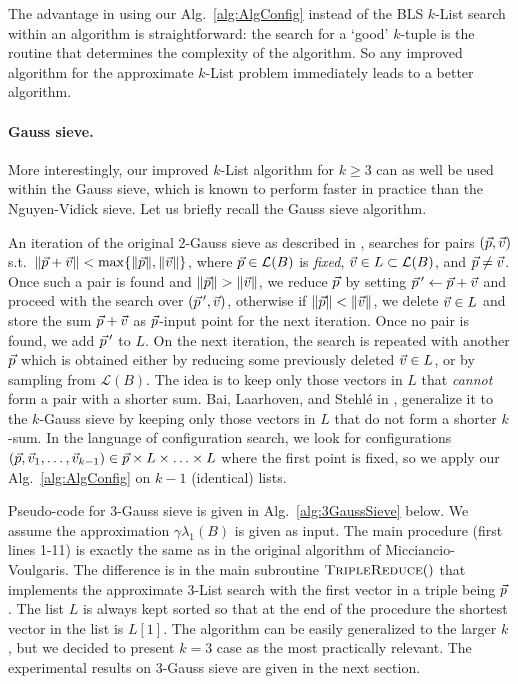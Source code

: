 The advantage in using our Alg.~\ref{alg:AlgConfig} instead of the BLS $k$-List search within an \appSVP algorithm is straightforward: the search for a `good' $k$-tuple is the routine that determines the complexity of the algorithm. So any improved algorithm for the approximate $k$-List problem immediately leads to a better \appSVP algorithm. 

\paragraph{Gauss sieve.} More interestingly, our improved $k$-List algorithm for $k \geq 3$ can as well be used within the Gauss sieve, which is known to perform faster in practice than the Nguyen-Vidick sieve. Let us briefly recall the Gauss sieve algorithm.

An iteration of the original 2-Gauss sieve as described in \cite{STOC:MicVou10}, searches for pairs $(\pvec, \vvec)$ s.t.\ $\| \pvec + \vvec \| < \max \{\| \pvec \|, \| \vvec \| \}$, where $\pvec \in \mathcal{L}(B)$ is \emph{fixed}, $\vvec \in L \subset \mathcal{L}(B)$, and $\pvec \neq \vvec$. Once such a pair is found and $\| \pvec \| > \| \vvec \|$, we reduce $\pvec$ by setting $\pvec'  \leftarrow \pvec + \vvec$ and proceed with the search over $(\pvec', \vvec)$, otherwise if $\| \pvec \| < \| \vvec \|$, we delete $\vvec \in L$ and store the sum $ \pvec + \vvec$ as $\pvec$-input point for the next iteration. Once no pair is found, we add $\pvec'$ to $L$. On the next iteration, the search is repeated with another $\pvec$ which is obtained either by reducing some previously deleted $\vvec \in L$, or by sampling from $\mathcal{L}(B)$. The idea is to keep only those vectors in $L$ that \emph{cannot} form a pair with a shorter sum. Bai, Laarhoven, and Stehl\'{e}  in \cite{BLS16}, generalize it to the $k$-Gauss sieve by keeping only those vectors in $L$ that do not form a shorter $k$-sum. In the language of configuration search, we look for configurations $(\pvec, \vvec_1, \ldots, \vvec_{k-1}) \in \pvec \times L \times \ldots \times L$ where the first point is fixed, so we apply our Alg.~\ref{alg:AlgConfig} on $k-1$ (identical) lists.

Pseudo-code for $3$-Gauss sieve is given in Alg.~\ref{alg:3GaussSieve} below. We assume the approximation $\gamma \lambda_1(B)$ is given as input. The main procedure (first lines 1-11) is exactly the same as in the original algorithm of Micciancio-Voulgaris. The difference is in the main subroutine $\Call{TripleReduce}$ that implements the approximate $3$-List search with the first vector in a triple being $\pvec$. The list $L$ is always kept sorted so that at the end of the procedure the shortest vector in the list is $L[1]$.
The algorithm can be easily generalized to the larger $k$, but we decided to present $k=3$ case as the most practically relevant. The experimental results on $3$-Gauss sieve are given in the next section.

